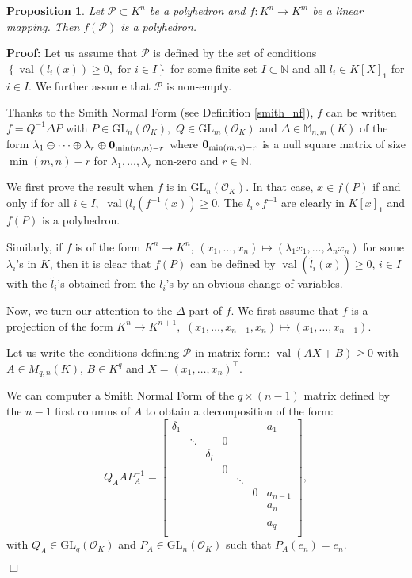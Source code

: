 \documentclass[a4paper,12pt]{article}
\newenvironment{proof}{\hbox{}\vspace{-0.5cm} {\bf Proof:}}{\hfill $\Box$ \\}
\newtheorem{proposition}[theorem]{Proposition}
\newcommand{\N}{\mathbb{N}} %
\newcommand{\allmat}{\mathbb{M}} %
\newcommand{\PP}{\mathcal{P}}
\DeclareMathOperator{\val}{val}
\newcommand{\OK}{\mathcal{O}_K}
\newcommand{\GL}{\mathrm{GL}}
\begin{document}
\begin{proposition}
Let $\PP \subset K^n$ be a polyhedron and $f: K^n \rightarrow K^m$
be a linear mapping. Then $f(\PP)$ is a polyhedron.
\end{proposition}
\begin{proof}
Let us assume that 
$\PP$ is defined by the set of conditions $\left\lbrace \val (l_i (x) ) \geq 0, \textrm{ for } i \in I \right\rbrace$ for some
finite set $I \subset \N$ and all $l_i \in K[X]_1$ for $i \in I.$
We further assume that $\PP$ is non-empty.

Thanks to the Smith Normal Form (see Definition \ref{smith_nf}), $f$
can be written $f=Q^{-1} \Delta P$
with $P \in \GL_n(\OK),$ $Q \in \GL_m(\OK)$
and $\Delta \in \allmat_{n,m}(K)$ of the form $\lambda_1 \oplus \cdots \oplus \lambda_r \oplus {\bf 0}_{\min(m,n)-r}$
  where ${\bf 0}_{\min(m,n)-r}$ is a null square matrix of size $\min(m,n)-r$ for $\lambda_1,\dots,\lambda_r$ non-zero and $r \in \N.$

We first prove the result when $f$ is in $\GL_n(\OK)$.
In that case, $x \in f(P)$ if and only if for all
$i \in I,$
$\val (l_i (f^{-1}(x)) \geq 0$.
The $l_i \circ f^{-1}$ are clearly in $K[x]_1$
and $f(P)$ is a polyhedron.

Similarly, if $f$ is of the form $K^n \rightarrow K^n$,
$(x_1,\dots,x_n) \mapsto (\lambda_1 x_1,\dots,\lambda_n x_n)$
for some $\lambda_i$'s in $K$,
then it is clear that $f(P)$
can be defined by $\val (\widetilde{l_i}(x)) \geq 0$, $i \in I$
with the $\widetilde{l_i}$'s obtained from the $l_i$'s by an
obvious change of variables.

Now, we turn our attention to the $\Delta$ part of $f.$
We first assume that $f$ is a projection 
of the form $K^n \rightarrow K^{n+1},$
$(x_1,\dots,x_{n-1},x_n)\mapsto (x_1,\dots,x_{n-1}).$

Let us write the conditions defining $\PP$
in matrix form:
$\val(A X+B) \geq 0$
with $A \in M_{q,n}(K)$, $B \in K^q$
and $X=(x_1,\dots,x_n)^\intercal.$

We can computer a Smith Normal Form
of the $q \times (n-1)$ matrix defined by the 
$n-1$ first columns of $A$
to obtain a decomposition of the form:
\[ Q_A A P_A^{-1} = \begin{bmatrix}
\delta_1	& 		& 			&   &		 &  &a_1	\\
			& \ddots& 			& 0	&		 &	&		\\
			&		& \delta_l  &   & 		 &	&		\\
			&		&			&0  & 		 &	& 		\\
			&		&			&   & \ddots &	&		\\
			&		&			&	&		 & 0&a_{n-1} \\
			&		&			&	&		 &	&a_n 	\\
			&		&			&	&		 &	&    	\\
			&		&			&	&		 &	&a_q 	\\			
\end{bmatrix},\]
with $Q_A \in \GL_q(\OK)$ and $P_A \in \GL_n(\OK)$ such that $P_A(e_n)=e_n.$


\end{proof}
\end{document}
